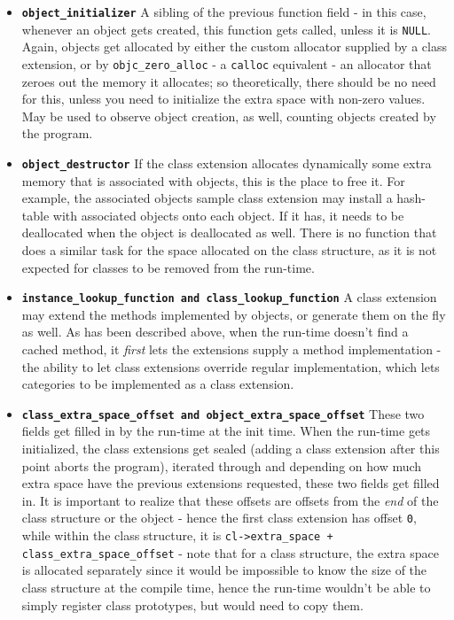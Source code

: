 \begin{itemize}
  \item{\bf{\tt{object\_initializer}}} A sibling of the previous function field - in this case, whenever an object gets created, this function gets called, unless it is \texttt{NULL}. Again, objects get allocated by either the custom allocator supplied by a class extension, or by \verb=objc_zero_alloc= - a \verb=calloc= equivalent - an allocator that zeroes out the memory it allocates; so theoretically, there should be no need for this, unless you need to initialize the extra space with non-zero values. May be used to observe object creation, as well, counting objects created by the program.
  \item{\bf{\tt{object\_destructor}}} If the class extension allocates dynamically some extra memory that is associated with objects, this is the place to free it. For example, the associated objects sample class extension may install a hash-table with associated objects onto each object. If it has, it needs to be deallocated when the object is deallocated as well.
  There is no function that does a similar task for the space allocated on the class structure, as it is not expected for classes to be removed from the run-time.
  \item{\bf{\tt{instance\_lookup\_function} and \tt{class\_lookup\_function}}} A class extension may extend the methods implemented by objects, or generate them on the fly as well. As has been described above, when the run-time doesn't find a cached method, it \emph{first} lets the extensions supply a method implementation - the ability to let class extensions override regular implementation, which lets categories to be implemented as a class extension.
  \item{\bf{\tt{class\_extra\_space\_offset} and \tt{object\_extra\_space\_offset}}} These two fields get filled in by the run-time at the init time. When the run-time gets initialized, the class extensions get sealed (adding a class extension after this point aborts the program), iterated through and depending on how much extra space have the previous extensions requested, these two fields get filled in. It is important to realize that these offsets are offsets from the \emph{end} of the class structure or the object - hence the first class extension has offset \texttt{0}, while within the class structure, it is \texttt{cl->extra\_space + class\_extra\_space\_offset} - note that for a class structure, the extra space is allocated separately since it would be impossible to know the size of the class structure at the compile time, hence the run-time wouldn't be able to simply register class prototypes, but would need to copy them. 
 
\end{itemize}

